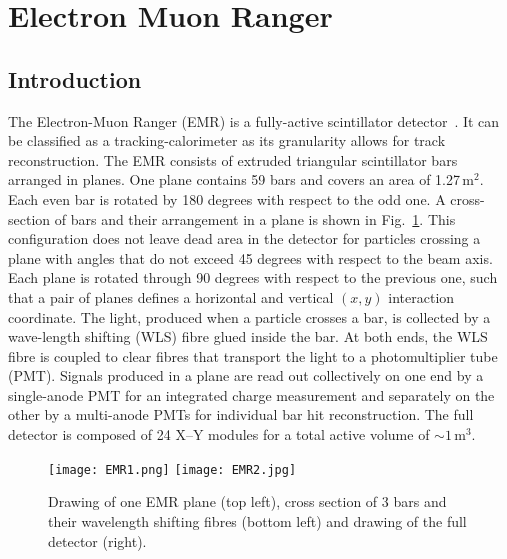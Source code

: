 \graphicspath{{05-EMR/Figures/}}

\section{Electron Muon Ranger}
\label{Sect:EMR}

\subsection{Introduction}
\label{SubSect:EMR_Intro}

The Electron-Muon Ranger (EMR) is a fully-active scintillator detector~\cite{2016JInst..11T10007}. It can be classified as a tracking-calorimeter as its granularity allows for track reconstruction. The EMR consists of extruded triangular scintillator bars arranged in planes. One plane contains 59 bars and covers an area of 1.27\,m$^2$. Each even bar is rotated by 180 degrees with respect to the odd one. A cross-section of bars and their arrangement in a plane is shown in Fig.~\ref{fig:EMR}. This configuration does not leave dead area in the detector for particles crossing a plane with angles that do not exceed 45 degrees with respect to the beam axis. Each plane is rotated through 90 degrees with respect to the previous one, such that a pair of planes defines a horizontal and vertical $(x, y)$ interaction coordinate. The light, produced when a particle crosses a bar, is collected by a wave-length shifting (WLS) fibre glued inside the bar. At both ends, the WLS fibre is coupled to clear fibres that transport the light to a photomultiplier tube (PMT). Signals produced in a plane are read out collectively on one end by a single-anode PMT for an integrated charge measurement and separately on the other by a multi-anode PMTs for individual bar hit reconstruction. The full detector is composed of 24 X--Y modules for a total active volume of $\sim 1$\,m$^3$.

\begin{figure}
	\begin{center}
		\texttt{[image: EMR1.png]}
		\hfill
		\texttt{[image: EMR2.jpg]}
		\caption{Drawing of one EMR plane (top left), cross section of 3 bars and their wavelength shifting fibres (bottom left) and drawing of the full detector (right).}
		\label{fig:EMR}
	\end{center}
\end{figure}

